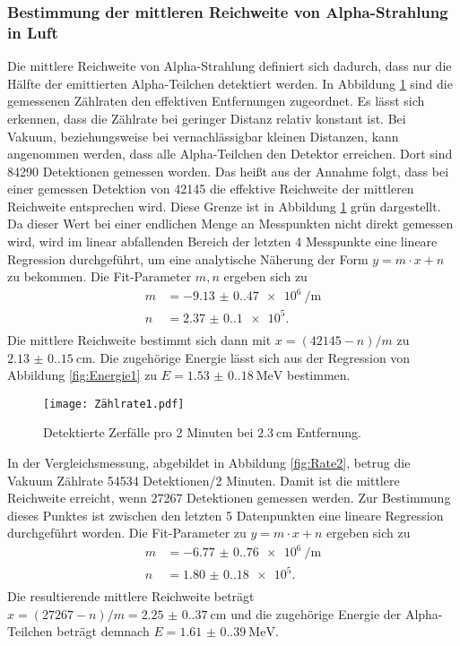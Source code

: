 \subsubsection{Bestimmung der mittleren Reichweite von Alpha-Strahlung in Luft}
Die mittlere Reichweite von Alpha-Strahlung definiert sich dadurch, dass nur die Hälfte der emittierten Alpha-Teilchen
detektiert werden. In Abbildung \ref{fig:Rate1} sind die gemessenen Zählraten den effektiven Entfernungen
zugeordnet. Es lässt sich erkennen, dass die Zählrate bei geringer Distanz relativ konstant ist. Bei Vakuum, beziehungsweise
bei vernachlässigbar kleinen Distanzen, kann angenommen werden, dass alle Alpha-Teilchen den Detektor erreichen.
Dort sind 84290 Detektionen gemessen worden. Das heißt aus der Annahme folgt, dass bei einer gemessen Detektion von 42145
die effektive Reichweite der mittleren Reichweite entsprechen wird. Diese Grenze ist in Abbildung \ref{fig:Rate1} grün dargestellt.
Da dieser Wert bei einer endlichen Menge an Messpunkten nicht direkt gemessen wird, wird im linear abfallenden Bereich der letzten 4 Messpunkte 
eine lineare Regression durchgeführt, um eine analytische Näherung der Form $y=m\cdot x+n$
zu bekommen. Die Fit-Parameter $m,n$ ergeben sich zu
\begin{align*}
  m&=\qty{-9.13(0.47)e6}{\per\meter}\\
  n&=\num{2.37(0.10)e5}.\\
\end{align*}
Die mittlere Reichweite bestimmt sich dann mit $x=(42145-n)/m$ zu $\qty{2.13(0.15)}{\centi\meter}$.
Die zugehörige Energie lässt sich aus der Regression von Abbildung \ref{fig:Energie1} zu $E=\qty{1.53(0.18)}{\mega\electronvolt}$ 
bestimmen.
\begin{figure}[H]
  \centering
  \texttt{[image: Zählrate1.pdf]}
  \caption{Detektierte Zerfälle pro 2 Minuten bei $\qty{2.3}{\centi\meter}$ Entfernung.}
  \label{fig:Rate1}
\end{figure}
\noindent In der Vergleichsmessung, abgebildet in Abbildung \ref{fig:Rate2}, betrug die Vakuum Zählrate
54534 Detektionen/2 Minuten. Damit ist die mittlere Reichweite erreicht, wenn 27267 Detektionen 
gemessen werden. Zur Bestimmung dieses Punktes ist zwischen den letzten 5 Datenpunkten eine lineare
Regression durchgeführt worden. Die Fit-Parameter zu $y=m\cdot x+n$ ergeben sich zu
\begin{align*}
  m&=\qty{-6.77(0.76)e6}{\per\meter}\\
  n&=\num{1.80(0.18)e5}.\\
\end{align*}
Die resultierende mittlere Reichweite beträgt $x=(27267-n)/m=\qty{2.25(0.37)}{\centi\meter}$
und die zugehörige Energie der Alpha-Teilchen beträgt demnach $E=\qty{1.61(0.39)}{\mega\electronvolt}$.

